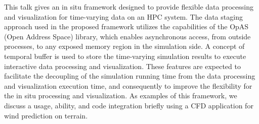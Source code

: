 \license


This talk gives an in situ framework designed to provide flexible data processing and visualization for time-varying data on an HPC system. The data staging approach used in the proposed framework utilizes the capabilities of the OpAS (Open Address Space) library, which enables asynchronous access, from outside processes, to any exposed memory region in the simulation side. A concept of temporal buffer is used to store the time-varying simulation results to execute interactive data processing and visualization. These features are expected to facilitate the decoupling of the simulation running time from the data processing and visualization execution time, and consequently to improve the flexibility for the in situ processing and visualization. As examples of this framework, we discuss a usage, ability, and code integration briefly using a CFD application for wind prediction on terrain.

